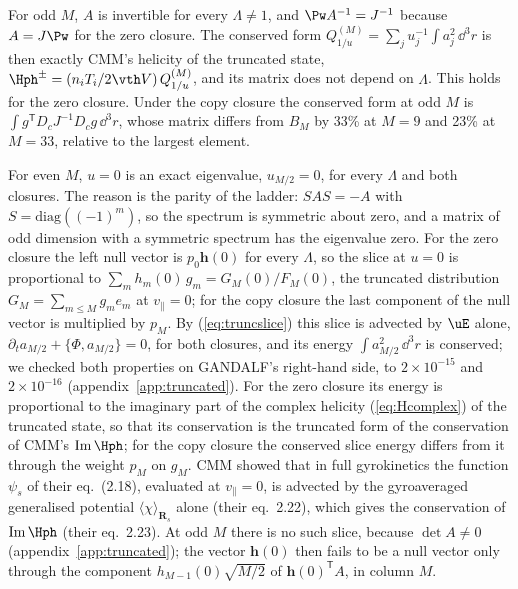 For odd $M$, $A$ is invertible for every $\Lambda\neq1$, and $\Pw A^{-1}=J^{-1}$ because $A=J\Pw$ for the zero closure. The conserved form $Q^{(M)}_{1/u}=\sum_ju_j^{-1}\int a_j^2\,\dd^3r$ is then exactly CMM's helicity of the truncated state, $\Hph^\pm=(n_iT_i/2\vth V)\,Q^{(M)}_{1/u}$, and its matrix does not depend on $\Lambda$. This holds for the zero closure. Under the copy closure the conserved form at odd $M$ is $\int g^{\mathsf T}D_cJ^{-1}D_cg\,\dd^3r$, whose matrix differs from $B_M$ by 33\% at $M=9$ and 23\% at $M=33$, relative to the largest element.

For even $M$, $u=0$ is an exact eigenvalue, $u_{M/2}=0$, for every $\Lambda$ and both closures. The reason is the parity of the ladder: $SAS=-A$ with $S=\mathrm{diag}((-1)^m)$, so the spectrum is symmetric about zero, and a matrix of odd dimension with a symmetric spectrum has the eigenvalue zero. For the zero closure the left null vector is $p_0\boldsymbol h(0)$ for every $\Lambda$, so the slice at $u=0$ is proportional to $\sum_mh_m(0)\,g_m=G_M(0)/F_M(0)$, the truncated distribution $G_M=\sum_{m\le M}g_me_m$ at $v_\parallel=0$; for the copy closure the last component of the null vector is multiplied by $p_M$. By (\ref{eq:truncslice}) this slice is advected by $\uE$ alone, $\partial_ta_{M/2}+\{\Phi,a_{M/2}\}=0$, for both closures, and its energy $\int a_{M/2}^2\,\dd^3r$ is conserved; we checked both properties on GANDALF's right-hand side, to $2\times10^{-15}$ and $2\times10^{-16}$ (appendix~\ref{app:truncated}). For the zero closure its energy is proportional to the imaginary part of the complex helicity (\ref{eq:Hcomplex}) of the truncated state, so that its conservation is the truncated form of the conservation of CMM's $\mathrm{Im}\,\Hph$; for the copy closure the conserved slice energy differs from it through the weight $p_M$ on $g_M$. CMM showed that in full gyrokinetics the function $\psi_s$ of their eq.~(2.18), evaluated at $v_\parallel=0$, is advected by the gyroaveraged generalised potential $\langle\chi\rangle_{\boldsymbol R_s}$ alone (their eq.~2.22), which gives the conservation of $\mathrm{Im}\,\Hph$ (their eq.~2.23). At odd $M$ there is no such slice, because $\det A\neq0$ (appendix~\ref{app:truncated}); the vector $\boldsymbol h(0)$ then fails to be a null vector only through the component $h_{M-1}(0)\sqrt{M/2}$ of $\boldsymbol h(0)^{\mathsf T}A$, in column $M$.


